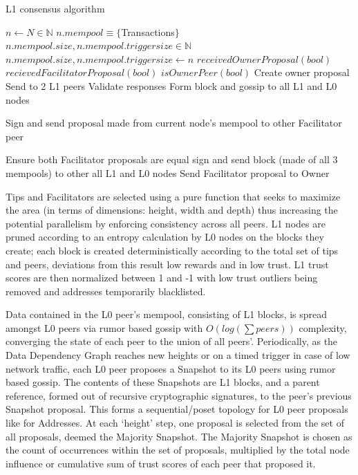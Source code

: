 \documentclass{article}
\begin{document}
\begin{algorithm}
\caption{L1 consensus algorithm}\label{alg:cap}
\begin{algorithmic}

\State $n \gets N \in \mathbb{N}$ 
\State $n.mempool \equiv \{ $Transactions$ \}$
\State $n.mempool.size, n.mempool.triggersize \in \mathbb{N}$
\State $n.mempool.size, n.mempool.triggersize \gets n$ 
\State $received Owner Proposal(bool)$
\State $recieved Facilitator Proposal(bool)$
\State $isOwnerPeer(bool)$
		 \State Create owner proposal
		 \State Send to 2 L1 peers
		 \State Validate responses
		 \State Form block and gossip to all L1 and L0 nodes
		
			\State Sign and send proposal made from current node's mempool to other Facilitator peer
		
			\State Ensure both Facilitator proposals are equal
			\State sign and send block (made of all 3 mempools) to other all L1 and L0 nodes
		\Else
			\State Send Facilitator proposal to Owner
		\EndIf
	\EndIf
\EndWhile

\end{algorithmic}
\end{algorithm}

Tips and Facilitators are selected using a pure function that seeks to maximize the area (in terms of dimensions: height, width and depth) thus increasing the potential parallelism by enforcing consistency across all peers. L1 nodes are pruned according to an entropy calculation by L0 nodes on the blocks they create; each block is created deterministically according to the total set of tips and peers, deviations from this result low rewards and in low trust. L1 trust scores are then normalized between 1 and -1 with low trust outliers being removed and addresses temporarily blacklisted.

Data contained in the L0 peer's mempool, consisting of L1 blocks, is spread amongst L0 peers via rumor based gossip with $O(log(\sum peers))$ complexity, converging the state of each peer to the union of all peers'. Periodically, as the Data Dependency Graph reaches new heights or on a timed trigger in case of low network traffic, each L0 peer proposes a Snapshot to its L0 peers using rumor based gossip. The contents of these Snapshots are L1 blocks, and a parent reference, formed out of recursive cryptographic signatures, to the peer’s previous Snapshot proposal. This forms a sequential/poset topology for L0 peer proposals like for Addresses. At each ‘height’ step, one proposal is selected from the set of all proposals, deemed the Majority Snapshot. The Majority Snapshot is chosen as the count of occurrences within the set of proposals, multiplied by the total  node influence or cumulative sum of trust scores of each peer that proposed it. 
	
\end{document}
